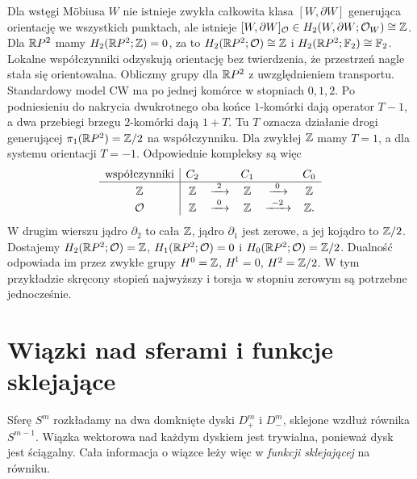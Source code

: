 \begin{przyklad}
\label{prz:pd-rp2-21}
Dla wstęgi Möbiusa $W$
nie istnieje zwykła
całkowita klasa
$[W,\partial W]$
generująca orientację
we wszystkich punktach,
ale istnieje
$[W,\partial W]_{\mathcal O}
\in H_2(W,\partial W;\mathcal O_W)
\cong\mathbb{Z}$.
Dla $\mathbb{R} P^2$ mamy
$H_2(\mathbb{R} P^2;\mathbb{Z})=0$,
za to
$H_2(\mathbb{R} P^2;\mathcal O)\cong\mathbb{Z}$
i $H_2(\mathbb{R} P^2;\mathbb F_2)
\cong\mathbb F_2$.
Lokalne współczynniki
odzyskują orientację
bez twierdzenia,
że przestrzeń nagle
stała się orientowalna.
Obliczmy grupy dla $\mathbb{R} P^2$ z uwzględnieniem transportu.
Standardowy model CW ma po jednej komórce w stopniach $0,1,2$.
Po podniesieniu do nakrycia dwukrotnego oba końce $1$-komórki
dają operator $T-1$, a dwa przebiegi brzegu $2$-komórki
dają $1+T$. Tu $T$ oznacza działanie drogi generującej
$\pi_1(\mathbb{R} P^2)=\mathbb{Z}/2$ na współczynniku.
Dla zwykłej $\mathbb{Z}$ mamy $T=1$, a dla systemu orientacji $T=-1$.
Odpowiednie kompleksy są więc
\[
 \begin{array}{c|ccccc}
  \text{współczynniki}&C_2&&C_1&&C_0\\ \hline
  \Z&\Z&\xrightarrow{\ 2\ }&\Z&\xrightarrow{\ 0\ }&\Z\\
  \mathcal O&\Z&\xrightarrow{\ 0\ }&\Z&\xrightarrow{\ -2\ }&\Z .
 \end{array}
\]
W drugim wierszu jądro $\partial_2$ to cała $\mathbb{Z}$,
jądro $\partial_1$ jest zerowe, a jej kojądro to $\mathbb{Z}/2$.
Dostajemy $H_2(\mathbb{R} P^2;\mathcal O)=\mathbb{Z}$,
$H_1(\mathbb{R} P^2;\mathcal O)=0$ i
$H_0(\mathbb{R} P^2;\mathcal O)=\mathbb{Z}/2$.
Dualność odpowiada im przez zwykłe grupy
$H^0=\mathbb{Z}$, $H^1=0$, $H^2=\mathbb{Z}/2$.
W tym przykładzie skręcony stopień najwyższy i torsja
w stopniu zerowym są potrzebne jednocześnie.
\end{przyklad}

\section{Wiązki nad sferami i funkcje sklejające}
\label{sec:clutching-16}

Sferę $S^m$ rozkładamy na dwa
domknięte dyski $D^m_+$ i $D^m_-$,
sklejone wzdłuż równika
$S^{m-1}$. Wiązka wektorowa
nad każdym dyskiem jest
trywialna, ponieważ dysk
jest ściągalny. Cała informacja
o wiązce leży więc w
\emph{funkcji sklejającej}
na równiku.

